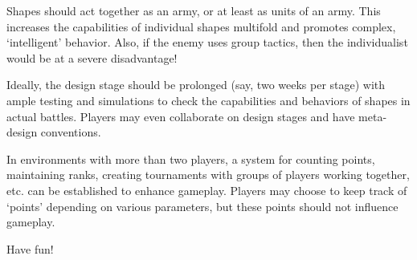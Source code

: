 \documentclass[a4paper,11pt]{article}
\begin{document}
Shapes should act together as an army, or at least as units of an army. This increases the capabilities of individual shapes multifold and promotes complex, `intelligent' behavior. Also, if the enemy uses group tactics, then the individualist would be at a severe disadvantage!

Ideally, the design stage should be prolonged (say, two weeks per stage) with ample testing and simulations to check the capabilities and behaviors of shapes in actual battles. Players may even collaborate on design stages and have meta-design conventions.

In environments with more than two players, a system for counting points, maintaining ranks, creating tournaments with groups of players working together, etc. can be established to enhance gameplay. Players may choose to keep track of `points' depending on various parameters, but these points should not influence gameplay.

Have fun!
\end{document}
